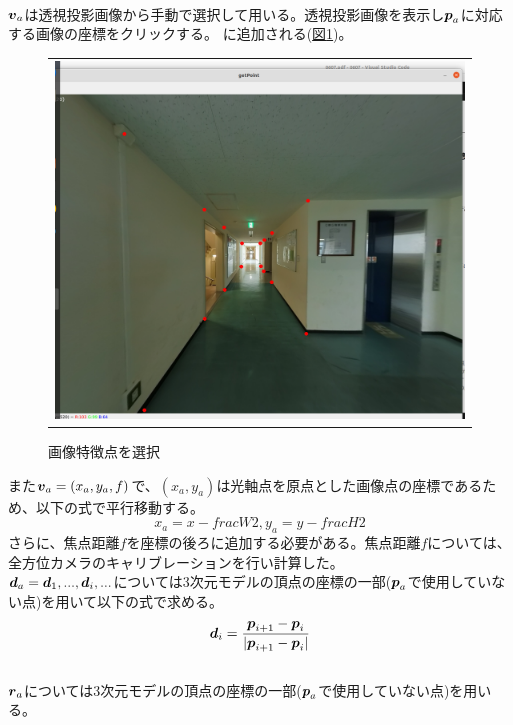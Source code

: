 \documentclass[]{jarticle}          %
\begin{document}
\\
$\mbox{\boldmath $v$}_a$は透視投影画像から手動で選択して用いる。透視投影画像を表示し$\mbox{\boldmath $p$}_a$に対応する画像の座標をクリックする。
に追加される(\hyperref[two]{図\ref{two}})。
\begin{figure}[!ht]
  \begin{center}
    \begin{tabular}{c}
      \includegraphics[keepaspectratio, scale=0.3]{figures/select_point.png}
    \end{tabular}
  \end{center}
  \caption{画像特徴点を選択}
  \label{two}
\end{figure}
また$\mbox{\boldmath $v$}_a=(x_a,y_a,f)$で、$(x_a,y_a)$は光軸点を原点とした画像点の座標であるため、以下の式で平行移動する。
\begin{equation}
  x_a = x - frac{W}{2}, y_a = y - frac{H}{2}
\end{equation}
さらに、焦点距離$f$を座標の後ろに追加する必要がある。焦点距離$f$については、全方位カメラのキャリブレーションを行い計算した。
\\
$\mbox{\boldmath $d$}_a={\mbox{\boldmath $d$}_1,...,\mbox{\boldmath $d$}_i,...}$については3次元モデルの頂点の座標の一部($\mbox{\boldmath $p$}_a$で使用していない点)を用いて以下の式で求める。
\begin{equation}
  \mbox{\boldmath $d$}_i = \frac{\mbox{\boldmath $p$}_{i+1}-\mbox{\boldmath $p$}_{i}}{|\mbox{\boldmath $p$}_{i+1}-\mbox{\boldmath $p$}_{i}|}
\end{equation}
\\
$\mbox{\boldmath $r$}_a$については3次元モデルの頂点の座標の一部($\mbox{\boldmath $p$}_a$で使用していない点)を用いる。
\\
\end{document}
